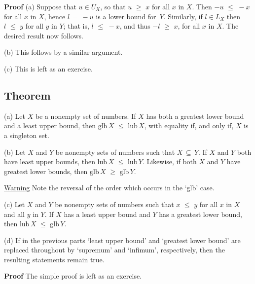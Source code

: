 \V

        {\bf Proof} (a) Suppose that $u{\in}U_{X}$, so that $u\,\,{\geq}\,\,x$ for all $x$ in $X$.
    Then $-u\,\,{\leq}\,\,-x$ for all $x$ in $X$, hence $l \,=\, -u$ is a lower bound for~$Y$.
    Similarly, if $l{\in}L_{X}$ then $l\,\,{\leq}\,\,y$ for all $y$ in $Y$; that is, $l\,\,{\leq}\,\,-x$, and thus $-l\,\,{\geq}\,\,x$, for all $x$ in $X$.
    The desired result now follows.

\V

        (b) This follows by a similar argument.

\V

        (c) This is left as an exercise.

\V

            \subsection{\small{\bf Theorem}}
            \label{ThmB30.08K}

\V

\noindent (a) Let $X$ be a nonempty set of numbers. If $X$ has both a greatest lower bound and a least upper bound,
    then $\mbox{glb}\,X\,\,{\leq}\,\,\mbox{lub}\,X$, with equality if, and only if, $X$ is a singleton set.

\V

        (b) Let $X$ and $Y$ be nonempty sets of numbers such that $X \,{\subseteq}\, Y$.
    If $X$ and $Y$ both have least upper bounds, then $\mbox{lub}\,X\,\,{\leq}\,\,\mbox{lub}\,Y$.
    Likewise, if both $X$ and $Y$ have greatest lower bounds, then $\mbox{glb}\,X\,\,{\geq}\,\,\mbox{glb}\,Y$.

        \underline{Warning} Note the reversal of the order which occurs in the `glb' case.

\V

        (c) Let $X$ and $Y$ be nonempty sets of numbers such that $x\,\,{\leq}\,\,y$ for all $x$ in $X$ and all $y$ in $Y$.
    If $X$ has a least upper bound and $Y$ has a greatest lower bound, then $\mbox{lub}\,X\,\,{\leq}\,\,\mbox{glb}\,Y$.

\V


         (d) If in the previous parts `least upper bound' and `greatest lower bound' are replaced throughout by `supremum' and `infimum', respectively,
    then the resulting statements remain true.

\V

        {\bf Proof} The simple proof is left as an exercise.

